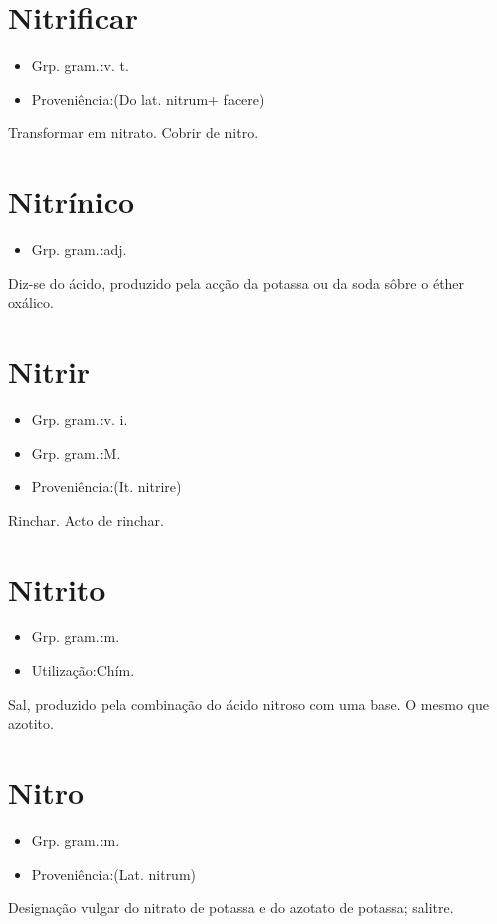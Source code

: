 \section{Nitrificar}
\begin{itemize}
\item {Grp. gram.:v. t.}
\end{itemize}
\begin{itemize}
\item {Proveniência:(Do lat. \textunderscore nitrum\textunderscore  + \textunderscore facere\textunderscore )}
\end{itemize}
Transformar em nitrato.
Cobrir de nitro.
\section{Nitrínico}
\begin{itemize}
\item {Grp. gram.:adj.}
\end{itemize}
Diz-se do ácido, produzido pela acção da potassa ou da soda sôbre o éther oxálico.
\section{Nitrir}
\begin{itemize}
\item {Grp. gram.:v. i.}
\end{itemize}
\begin{itemize}
\item {Grp. gram.:M.}
\end{itemize}
\begin{itemize}
\item {Proveniência:(It. \textunderscore nitrire\textunderscore )}
\end{itemize}
Rinchar.
Acto de rinchar.
\section{Nitrito}
\begin{itemize}
\item {Grp. gram.:m.}
\end{itemize}
\begin{itemize}
\item {Utilização:Chím.}
\end{itemize}
Sal, produzido pela combinação do ácido nitroso com uma base.
O mesmo que \textunderscore azotito\textunderscore .
\section{Nitro}
\begin{itemize}
\item {Grp. gram.:m.}
\end{itemize}
\begin{itemize}
\item {Proveniência:(Lat. \textunderscore nitrum\textunderscore )}
\end{itemize}
Designação vulgar do nitrato de potassa e do azotato de potassa; salitre.
